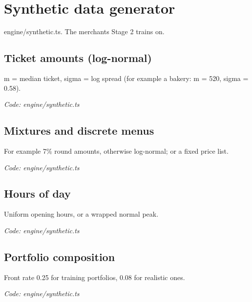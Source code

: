 \documentclass[11pt,a4paper]{article}
\newcommand{\where}[1]{\par{\small\itshape\color{mute}Code: #1}\par}
\begin{document}
\clearpage
\section{Synthetic data generator}
{\color{mute}engine/synthetic.ts. The merchants Stage 2 trains on.}

\subsection*{Ticket amounts (log-normal)}
\par\smallskip\noindent{}\par\smallskip
m = median ticket, sigma = log spread (for example a bakery: m = 520, sigma = 0.58).
\where{engine/synthetic.ts}

\subsection*{Mixtures and discrete menus}
\par\smallskip\noindent{}\par\smallskip
\par\smallskip\noindent{}\par\smallskip
For example 7\% round amounts, otherwise log-normal; or a fixed price list.
\where{engine/synthetic.ts}

\subsection*{Hours of day}
\par\smallskip\noindent{}\par\smallskip
Uniform opening hours, or a wrapped normal peak.
\where{engine/synthetic.ts}

\subsection*{Portfolio composition}
\par\smallskip\noindent{}\par\smallskip
Front rate 0.25 for training portfolios, 0.08 for realistic ones.
\where{engine/synthetic.ts}
\end{document}
